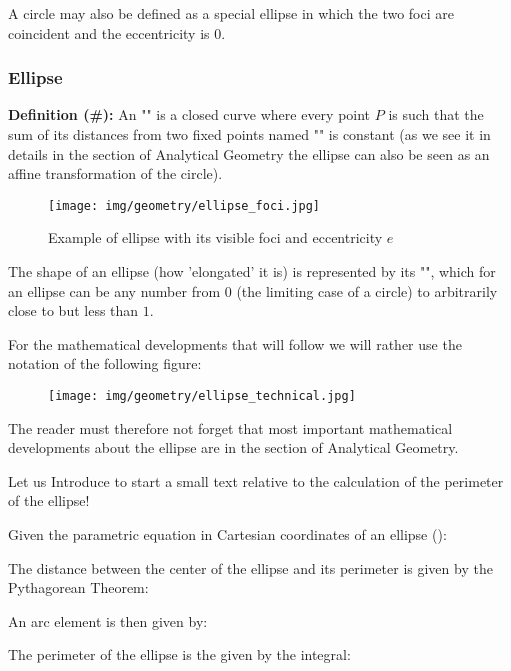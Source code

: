 {		\begin{tcolorbox}[title=Remark,colframe=black,arc=10pt]
	A circle may also be defined as a special ellipse in which the two foci are coincident and the eccentricity is $0$.
		\end{tcolorbox}
	
	\subsubsection{Ellipse}\label{ellipse}
	\textbf{Definition (\#\mydef):} An "" is a closed curve where every point $P$ is such that the sum of its distances from two fixed points named "" is constant (as we see it in details in the section of Analytical Geometry the ellipse can also be seen as an affine transformation of the circle).
	\begin{figure}[H]
		\centering
		\texttt{[image: img/geometry/ellipse\_foci.jpg]}
		\caption{Example of ellipse with its visible foci and eccentricity $e$}
	\end{figure}
	The shape of an ellipse (how 'elongated' it is) is represented by its "", which for an ellipse can be any number from $0$ (the limiting case of a circle) to arbitrarily close to but less than $1$.
	
	For the mathematical developments that will follow we will rather use the notation of the following figure:
	\begin{figure}[H]
		\centering
		\texttt{[image: img/geometry/ellipse\_technical.jpg]}
	\end{figure}
	\begin{tcolorbox}[title=Remark,colframe=black,arc=10pt]
	The reader must therefore not forget that most important mathematical developments about the ellipse are in the section of Analytical Geometry.
	\end{tcolorbox}
	Let us Introduce to start a small text relative to the calculation of the perimeter of the ellipse!
	
	Given the parametric equation in Cartesian coordinates of an ellipse ():
	
	The distance between the center of the ellipse and its perimeter is given by the Pythagorean Theorem:
	
	An arc element is then given by:
	
	The perimeter of the ellipse is the given by the integral:
	
}
